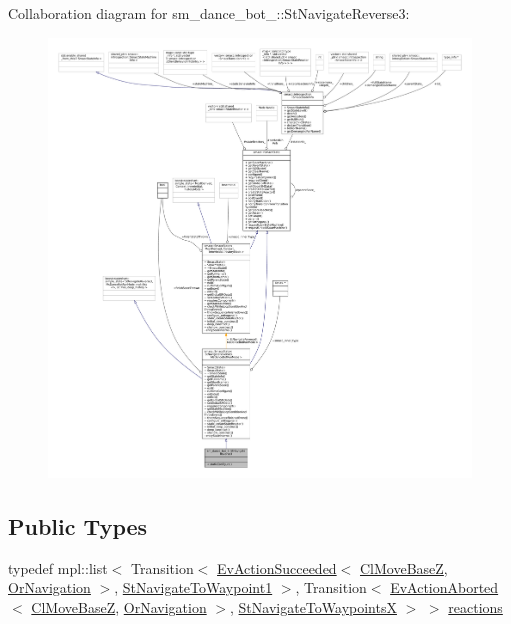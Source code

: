 Collaboration diagram for sm\+\_\+dance\+\_\+bot\+\_\+:\+:St\+Navigate\+Reverse3\+:
\nopagebreak
\begin{figure}[H]
\begin{center}
\leavevmode
\includegraphics[width=350pt]{structsm__dance__bot__2_1_1StNavigateReverse3__coll__graph}
\end{center}
\end{figure}
\subsection*{Public Types}
\begin{DoxyCompactItemize}
\item 
typedef mpl\+::list$<$ Transition$<$ \hyperlink{structsmacc_1_1default__events_1_1EvActionSucceeded}{Ev\+Action\+Succeeded}$<$ \hyperlink{classcl__move__base__z_1_1ClMoveBaseZ}{Cl\+Move\+BaseZ}, \hyperlink{classsm__dance__bot__2_1_1OrNavigation}{Or\+Navigation} $>$, \hyperlink{structsm__dance__bot__2_1_1StNavigateToWaypoint1}{St\+Navigate\+To\+Waypoint1} $>$, Transition$<$ \hyperlink{structsmacc_1_1default__events_1_1EvActionAborted}{Ev\+Action\+Aborted}$<$ \hyperlink{classcl__move__base__z_1_1ClMoveBaseZ}{Cl\+Move\+BaseZ}, \hyperlink{classsm__dance__bot__2_1_1OrNavigation}{Or\+Navigation} $>$, \hyperlink{structsm__dance__bot__2_1_1StNavigateToWaypointsX}{St\+Navigate\+To\+WaypointsX} $>$ $>$ \hyperlink{structsm__dance__bot__2_1_1StNavigateReverse3_a82697735f3009a034d770010306c1390}{reactions}
\end{DoxyCompactItemize}
